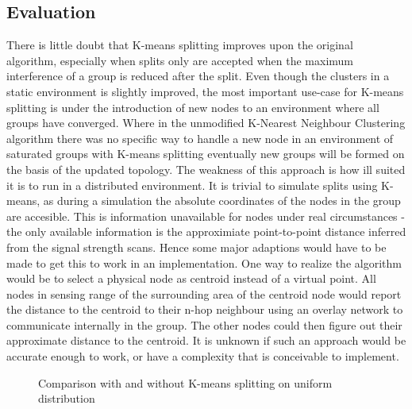 \subsection{Evaluation}
There is little doubt that K-means splitting improves upon the original algorithm, especially when splits only are accepted when the maximum interference of a group is reduced after the split.
Even though the clusters in a static environment is slightly improved, the most important use-case for K-means splitting is under the introduction of new nodes to an environment
where all groups have converged. Where in the unmodified K-Nearest Neighbour Clustering algorithm there was no specific way to handle a new node in an environment of saturated groups
with K-means splitting eventually new groups will be formed on the basis of the updated topology. The weakness of this approach is how ill suited it is to run in a distributed environment.
It is trivial to simulate splits using K-means, as during a simulation the absolute coordinates of the nodes in the group are accesible. This is information unavailable for nodes under
real circumstances - the only available information is the approximiate point-to-point distance inferred from the signal strength scans.
Hence some major adaptions would have to be made to get this to work in an implementation.
One way to realize the algorithm would be to select a physical node as centroid instead of a virtual point. All nodes in sensing range of the surrounding area of
the centroid node would report the distance to the centroid to their n-hop neighbour using an overlay network to communicate internally in the group. The other nodes could
then figure out their approximate distance to the centroid. It is unknown if such an approach would be accurate enough to work, or have a complexity that is conceivable to implement.  

\begin{figure}
	\centering
		\qquad
		\caption{Comparison with and without K-means splitting on uniform distribution}%
		\label{fig:kmeanscomparisonuniform}%
\end{figure}


